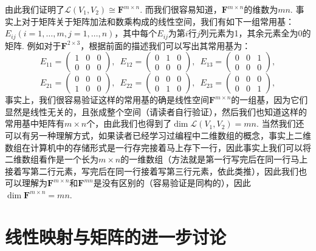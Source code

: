 由此我们证明了$\mathcal{L}(V_1,V_2)\cong\mathbf{F}^{m\times n}$. 而我们很容易知道，$\mathbf{F}^{m\times n}$的维数为$mn$. 事实上对于矩阵关于矩阵加法和数乘构成的线性空间，我们有如下一组常用基：$E_{ij}(i=1,\ldots,m,j=1,\ldots,n)$，其中每个$E_{ij}$为第$i$行$j$列元素为1，其余元素全为0的矩阵. 例如对于$\mathbf{F}^{2\times 3}$，根据前面的描述我们可以写出其常用基为：
\[E_{11}=\begin{pmatrix}
        1 & 0 & 0 \\
        0 & 0 & 0
    \end{pmatrix},\enspace E_{12}=\begin{pmatrix}
        0 & 1 & 0 \\
        0 & 0 & 0
    \end{pmatrix},\enspace E_{13}=\begin{pmatrix}
        0 & 0 & 1 \\
        0 & 0 & 0
    \end{pmatrix},\]
\[E_{21}=\begin{pmatrix}
        0 & 0 & 0 \\
        1 & 0 & 0
    \end{pmatrix},\enspace E_{22}=\begin{pmatrix}
        0 & 0 & 0 \\
        0 & 1 & 0
    \end{pmatrix},\enspace E_{23}=\begin{pmatrix}
        0 & 0 & 0 \\
        0 & 0 & 1
    \end{pmatrix},\]
事实上，我们很容易验证这样的常用基的确是线性空间$\mathbf{F}^{m\times n}$的一组基，因为它们显然是线性无关的，且张成整个空间（请读者自行验证），然后我们也知道这样的常用基中矩阵有$m\times n$个，由此我们也得到了$\dim\mathcal{L}(V_1,V_2)=mn$. 当然我们还可以有另一种理解方式，如果读者已经学习过编程中二维数组的概念，事实上二维数组在计算机中的存储形式是一行存完接着马上存下一行，因此事实上我们可以将二维数组看作是一个长为$m\times n$的一维数组（方法就是第一行写完后在同一行马上接着写第二行元素，写完后在同一行接着写第三行元素，依此类推），因此我们也可以理解为$\mathbf{F}^{m\times n}$和$\mathbf{F}^{mn}$是没有区别的（容易验证是同构的），因此$\dim\mathbf{F}^{m\times n}=mn$.

\section{线性映射与矩阵的进一步讨论}

